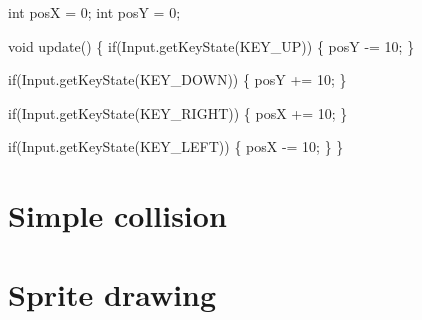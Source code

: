 \begin{DoxyCode}
\textcolor{keywordtype}{int} posX = 0;
\textcolor{keywordtype}{int} posY = 0;

\textcolor{keywordtype}{void} update()
\{
    \textcolor{keywordflow}{if}(Input.getKeyState(KEY\_UP))
    \{
        posY -= 10;
    \}

    \textcolor{keywordflow}{if}(Input.getKeyState(KEY\_DOWN))
    \{
        posY += 10;
    \}

    \textcolor{keywordflow}{if}(Input.getKeyState(KEY\_RIGHT))
    \{
        posX += 10;
    \}

    \textcolor{keywordflow}{if}(Input.getKeyState(KEY\_LEFT))
    \{
        posX -= 10;
    \}
\}
\end{DoxyCode}
 \hypertarget{collision}{}\section{Simple collision}\label{collision}
\hypertarget{sprites}{}\section{Sprite drawing}\label{sprites}
